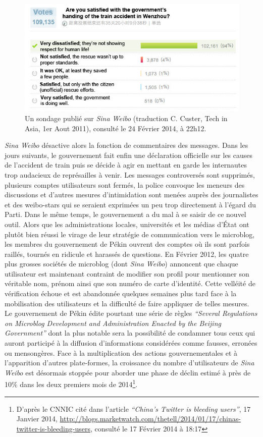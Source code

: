 \begin{figure}[htbp]
    \centering
    \includegraphics[scale=0.7]{figures/chap1/train.jpg}
    \caption[Sondage Weibo concernant l'accident de train de Wenzhou]{Un sondage publié sur \textit{Sina Weibo} (traduction C. Custer, Tech in Asia, 1er Aout 2011), consulté le 24 Février 2014, à 22h12.}
    \label{fig:poll_weibo}
\end{figure}

\textit{Sina Weibo} désactive alors la fonction de commentaires des messages. Dans les jours suivants, le gouvernement fait enfin une déclaration officielle sur les causes de l’accident de train puis se décide à agir en mettant en garde les internautes trop audacieux de représailles à venir. Les messages controversés sont supprimés, plusieurs comptes utilisateurs sont fermés, la police convoque les meneurs des discussions et d’autres mesures d’intimidation sont menées auprès des journalistes et des weibo-stars qui se seraient exprimées un peu trop directement à l’égard du Parti. Dans le même temps, le gouvernement a du mal à se saisir de ce nouvel outil. Alors que les administrations locales, universités et les médias d’État ont plutôt bien réussi le virage de leur stratégie de communication vers le microblog, les membres du gouvernement de Pékin ouvrent des comptes où ils sont parfois raillés, tournés en ridicule et harassés de questions. En Février 2012, les quatre plus grosses sociétés de microblog (dont \textit{Sina Weibo}) annoncent que chaque utilisateur est maintenant contraint de modifier son profil pour mentionner son véritable nom, prénom ainsi que son numéro de carte d’identité. Cette velléité de vérification échoue et est abandonnée quelques semaines plus tard face à la mobilisation des utilisateurs et la difficulté de faire appliquer de telles mesures. Le gouvernement de Pékin édite pourtant une série de règles \textit{“Several Regulations on Microblog Development and Administration Enacted by the Beijing Government”} dont la plus notable sera la possibilité de condamner tous ceux qui auront participé à la diffusion d’informations considérées comme fausses, erronées ou mensongères. Face à la multiplication des actions gouvernementales et à l’apparition d’autres plate-formes, la croissance du nombre d’utilisateurs de \textit{Sina Weibo} est désormais stoppée pour aborder une phase de déclin estimé à près de 10\% dans les deux premiers mois de 2014\footnote{D’après le CNNIC cité dans l’article  \textit{“China’s Twitter is bleeding users”}, 17 Janvier 2014, \url{http://blogs.marketwatch.com/thetell/2014/01/17/chinas-twitter-is-bleeding-users}, consulté le 17 Février 2014 à 18:17}. 

